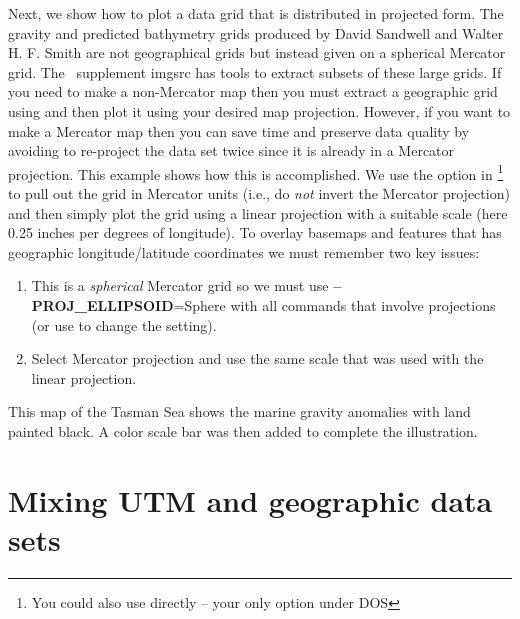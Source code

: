 Next, we show how to plot a data grid that is distributed in projected form.  The gravity and
predicted bathymetry grids produced by David Sandwell and Walter H. F. Smith are not geographical
grids but instead given on a spherical Mercator grid.  The \GMT\ supplement imgsrc has tools to
extract subsets of these large grids.  If you need to make a non-Mercator map then you must extract
a geographic grid using  and then plot it using your desired map projection.
However, if you want to make a Mercator map then you can save time and preserve data quality by
avoiding to re-project the data set twice since it is already in a Mercator projection.  This example
shows how this is accomplished.  We use the  option in \footnote{You could
also use  directly -- your only option under DOS} to pull out the
grid in Mercator units (i.e., do \emph{not} invert the Mercator projection) and then simply plot the
grid using a linear projection with a suitable scale (here 0.25 inches per degrees of longitude).
To overlay basemaps and features that has geographic longitude/latitude coordinates we must remember
two key issues:
\begin{enumerate}
	\item This is a \emph{spherical} Mercator grid so we must use \textbf{--PROJ\_ELLIPSOID}=Sphere with all
	commands that involve projections (or use  to change the setting).
	\item Select Mercator projection and use the same scale that was used with the linear projection.
\end{enumerate}


This map of the Tasman Sea shows the marine gravity anomalies with land painted black.  A color scale bar
was then added to complete the illustration.

 


\section{Mixing UTM and geographic data sets}

